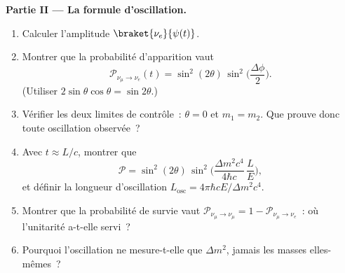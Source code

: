 \begin{problem}
\medskip\noindent\textbf{Partie II --- La formule d'oscillation.}
\begin{enumerate}[resume]
  \item Calculer l'amplitude $\braket{\nu_e}{\psi(t)}$.
  \item Montrer que la probabilité d'apparition vaut
        \[
        \mathcal P_{\nu_\mu \to \nu_e}(t) =
        \sin^2(2\theta)\,\sin^2\Big(\frac{\Delta\phi}{2}\Big) .
        \]
        (Utiliser $2\sin\theta\cos\theta = \sin2\theta$.)
  \item Vérifier les deux limites de contrôle~: $\theta = 0$ et
        $m_1 = m_2$. Que prouve donc toute oscillation observée~?
  \item Avec $t \approx L/c$, montrer que
        \[
        \mathcal P = \sin^2(2\theta)\,
        \sin^2\Big(\frac{\Delta m^2c^4}{4\hbar c}\,\frac{L}{E}\Big) ,
        \]
        et définir la longueur d'oscillation $L_{\text{osc}} =
        4\pi\hbar cE/\Delta m^2c^4$.
  \item Montrer que la probabilité de survie vaut $\mathcal P_{\nu_\mu \to
        \nu_\mu} = 1 - \mathcal P_{\nu_\mu\to\nu_e}$~: où
        l'unitarité a-t-elle servi~?
  \item Pourquoi l'oscillation ne mesure-t-elle que $\Delta m^2$,
        jamais les masses elles-mêmes~?
\end{enumerate}


\end{problem}
